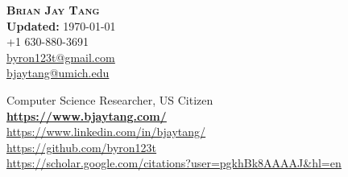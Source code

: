 \documentclass[A4,11pt]{article}
\begin{document}

\begin{minipage}[c]{0.3\textwidth}
    \textbf{\LARGE\scshape{Brian Jay Tang}} \\
    \textbf{Updated:} \today \\
     +1 630-880-3691 \\
     \href{mailto:byron123t@gmail.com}{\underline{byron123t@gmail.com}}\\
     \href{mailto:bjaytang@umich.edu}{\underline{bjaytang@umich.edu}}\\
\end{minipage}
\begin{minipage}[c]{0.5\textwidth}
    \normalsize{Computer Science Researcher, US Citizen} \\
    \href{https://www.bjaytang.com/}{ \normalsize{\underline{\textbf{https://www.bjaytang.com/}}}} \\
    \href{https://www.linkedin.com/in/bjaytang/}{ \normalsize{\underline{https://www.linkedin.com/in/bjaytang/}}} \\
    \href{https://github.com/byron123t}{ \underline{https://github.com/byron123t}} \\
    \href{https://scholar.google.com/citations?user=pgkhBk8AAAAJ&hl=en}{ \underline{https://scholar.google.com/citations?user=pgkhBk8AAAAJ\&hl=en}}
\end{minipage}

\nocite{*}





\printbibliography[title=Publications and Preprints]
% 








% 

    
\end{document}
